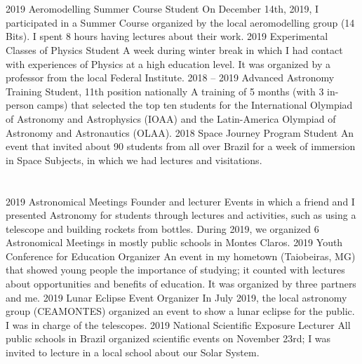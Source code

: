 \documentclass{cv}
\begin{document}
    \section*{}
        \begin{entrylist}
            \entry
                {2019}
                {Aeromodelling Summer Course}
                {Student}
                {On December 14th, 2019, I participated in a Summer Course organized by the local aeromodelling group (14 Bits). I spent 8 hours having lectures about their work.}
            \entry
                {2019}
                {Experimental Classes of Physics}
                {Student}
                {A week during winter break in which I had contact with experiences of Physics at a high education level. It was organized by a professor from the local Federal Institute.}
            \entry
                {2018 -- 2019}
                {Advanced Astronomy Training}
                {Student, 11th position nationally}
                {A training of 5 months (with 3 in-person camps) that selected the top ten students for the International Olympiad of Astronomy and Astrophysics (IOAA) and the Latin-America Olympiad of Astronomy and Astronautics (OLAA).}
            \entry
                {2018}
                {Space Journey Program}
                {Student}
                {An event that invited about 90 students from all over Brazil for a week of immersion in Space Subjects, in which we had lectures and visitations.}
        \end{entrylist}
    
    \section*{}
        \begin{entrylist}
            \entry
                {2019}
                {Astronomical Meetings}
                {Founder and lecturer}
                {Events in which a friend and I presented Astronomy for students through lectures and activities, such as using a telescope and building rockets from bottles. During 2019, we organized 6 Astronomical Meetings in mostly public schools in Montes Claros.}
            \entry
                {2019}
                {Youth Conference for Education}
                {Organizer}
                {An event in my hometown (Taiobeiras, MG) that showed young people the importance of studying; it counted with lectures about opportunities and benefits of education. It was organized by three partners and me.}
            \entry
                {2019}
                {Lunar Eclipse Event}
                {Organizer}
                {In July 2019, the local astronomy group (CEAMONTES) organized an event to show a lunar eclipse for the public. I was in charge of the telescopes.}
            \entry
                {2019}
                {National Scientific Exposure}
                {Lecturer}
                {All public schools in Brazil organized scientific events on November 23rd; I was invited to lecture in a local school about our Solar System.}
        \end{entrylist}
\end{document}
